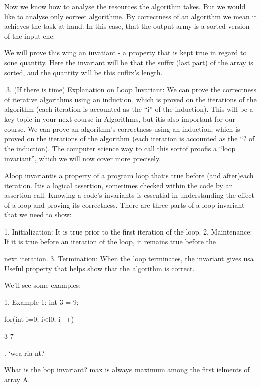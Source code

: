 Now we know how to analyse the resources the algorithm takes. But we
would like to analyse only eorreet algorithme. By correctness of an algorithm
we mean it achieves the task at hand. In this case, that the output army is a
sorted version of the input ene.

We will prove this wing an iuvatiant - a property that is kept true in regard
to sone quantity. Here the invariant will be that the suffix (last part) of the
array is sorted, aud the quantity will be this cuflix’s length.

 
3. (If there is time) Explanation on Loop Invariant:
We can prove the correctness of iterative algorithms using an induction, which is proved
on the iterations of the algorithm (each iteration is accounted as the “i” of the induction).
This will be a key topic in your next course in Algorithms, but itis also important for our
course. We can prove an algorithm's correctness using an induction, which is proved on
the iterations of the algorithm (each iteration is accounted as the “? of the induction).
The computer science way to call this sortof proofis a “loop invariant”, which we will
now cover more precisely.

Aloop invariantis a property of a program loop thatis true before (and after)each
iteration. Itis a logical assertion, sometimes checked within the code by an assertion
call. Knowing a code's invariants is essential in understanding the effect of a loop and
proving its correctness. There are three parts of a loop invariant that we need to show:

1. Initialization: It is true prior to the first iteration of the loop.
2. Maintenance: If it is true before an iteration of the loop, it remains true before the

next iteration.
3. Termination: When the loop terminates, the invariant gives usa Useful property
that helps show that the algorithm is correct.

We'll see some examples:

1. Example 1:
int 3 = 9;

for(int i=0; i<l0; i++)

3-7

. ‘wea ria nt?

 

What is the bop invariant?
max is always maximum among the first ielments of array A.

